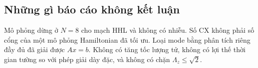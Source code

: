 \documentclass[11pt,a4paper]{article}
\newenvironment{revisedblock}{\par\color{revised}\ignorespaces}{\par}
\begin{document}
\begin{revisedblock}
\subsection{Những gì báo cáo không kết luận}
Mô phỏng dừng ở \(N=8\) cho mạch HHL và không có nhiễu.
Số CX không phải số cổng của một mô phỏng Hamiltonian đã tối ưu.
Loại mode bằng phân tích riêng đầy đủ đã giải được \(Ax=b\).
Không có tăng tốc lượng tử, không có lợi thế thời gian tường so với phép giải dày đặc, và không có chặn \(\Lambda_z\le\sqrt{2}\).
\end{revisedblock}



\end{document}
